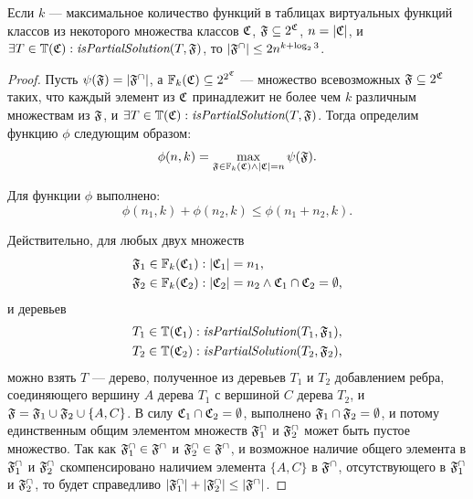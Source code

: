 \vspace{1cm}
\begin{lemma}\label{lemma:f_closure_size}
Если $k$ --- максимальное количество функций в таблицах виртуальных функций классов из некоторого множества классов $\mathfrak{C}$, $\mathfrak{F} \subseteq 2^{\mathfrak{C}}$, $n = |\mathfrak{C}|$, и $\exists T \in \mathbb{T}(\mathfrak{C}): \textit{isPartialSolution}(T, \mathfrak{F})$, то $|\mathfrak{F}^{\cap}| \le 2n^{k + \log_2{3}}$.
\end{lemma}
\begin{proof}

Пусть $\psi(\mathfrak{F}) = |\mathfrak{F}^{\cap}|$, а $\mathbb{F}_k(\mathfrak{C}) \subseteq 2^{2^{\mathfrak{C}}}$ --- множество всевозможных $\mathfrak{F} \subseteq 2^{\mathfrak{C}}$ таких, что каждый элемент из $\mathfrak{C}$ принадлежит не более чем $k$ различным множествам из $\mathfrak{F}$, и $\exists T \in \mathbb{T}(\mathfrak{C}): \textit{isPartialSolution}(T, \mathfrak{F})$. Тогда определим функцию $\phi$ следующим образом:
\begin{equation}\label{eq:phi_definition}
\phi(n, k) = \max_{\mathfrak{F} \in \mathbb{F}_k(\mathfrak{C}) \wedge |\mathfrak{C}| = n} \psi(\mathfrak{F}) \text{.}
\end{equation}

Для функции $\phi$ выполнено:
\begin{equation}\label{eq:phi_additive}
\phi(n_1, k) + \phi(n_2, k) \le \phi(n_1 + n_2, k)\text{.}
\end{equation}

Действительно, для любых двух множеств
\begin{equation}
\begin{aligned}
\mathfrak{F}_1 &\in \mathbb{F}_k(\mathfrak{C}_1): |\mathfrak{C}_1| = n_1 \text{,} \\
\mathfrak{F}_2 &\in \mathbb{F}_k(\mathfrak{C}_2): |\mathfrak{C}_2| = n_2 \wedge \mathfrak{C}_1 \cap \mathfrak{C}_2 = \emptyset \text{,}
\end{aligned}
\end{equation}
и деревьев
\begin{equation}\label{eq:t1_t2_def}
\begin{aligned}
T_1 &\in \mathbb{T}(\mathfrak{C}_1): \textit{isPartialSolution}(T_1, \mathfrak{F}_1) \text{,} \\
T_2 &\in \mathbb{T}(\mathfrak{C}_2): \textit{isPartialSolution}(T_2, \mathfrak{F}_2) \text{,}
\end{aligned}
\end{equation}
можно взять $T$ --- дерево, полученное из деревьев $T_1$ и $T_2$ добавлением ребра, соединяющего вершину $A$ дерева $T_1$ с вершиной $C$ дерева $T_2$, и $\mathfrak{F} = \mathfrak{F}_1 \cup \mathfrak{F}_2 \cup \{A, C\}$. В силу $\mathfrak{C}_1 \cap \mathfrak{C}_2 = \emptyset$, выполнено $\mathfrak{F}_1 \cap \mathfrak{F}_2 = \emptyset$, и потому единственным общим элементом множеств $\mathfrak{F}^{\cap}_1$ и $\mathfrak{F}^{\cap}_2$ может быть пустое множество. Так как $\mathfrak{F}^{\cap}_1 \in \mathfrak{F}^{\cap}$ и $\mathfrak{F}^{\cap}_2 \in \mathfrak{F}^{\cap}$, и возможное наличие общего элемента в $\mathfrak{F}^{\cap}_1$ и $\mathfrak{F}^{\cap}_2$ скомпенсировано наличием элемента $\{A, C\}$ в $\mathfrak{F}^{\cap}$, отсутствующего в $\mathfrak{F}^{\cap}_1$ и $\mathfrak{F}^{\cap}_2$, то будет справедливо $|\mathfrak{F}^{\cap}_1| + |\mathfrak{F}^{\cap}_2| \le |\mathfrak{F}^{\cap}|$.


\end{proof}

